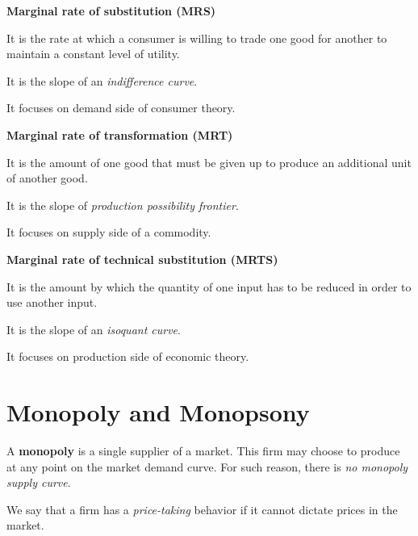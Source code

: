 \documentclass[8pt,a4paper]{extarticle}
\begin{document}
\begin{multicols}{3}
  \sectionbreak

  \begin{boxrmk}
    \textbf{Marginal rate of substitution (MRS)}
    \begin{bulletlist}
      \item It is the rate at which a consumer is willing to trade one good for another to maintain a constant level of utility.
      \item It is the slope of an \emph{indifference curve}.
      \item It focuses on demand side of consumer theory.
    \end{bulletlist}
    \textbf{Marginal rate of transformation (MRT)}
    \begin{bulletlist}
      \item It is the amount of one good that must be given up to produce an additional unit of another good.
      \item It is the slope of \emph{production possibility frontier}.
      \item It focuses on supply side of a commodity.
    \end{bulletlist}
    \textbf{Marginal rate of technical substitution (MRTS)}
    \begin{bulletlist}
      \item It is the amount by which the quantity of one input has to be reduced in order to use another input.
      \item It is the slope of an \emph{isoquant curve}.
      \item It focuses on production side of economic theory.
    \end{bulletlist}
  \end{boxrmk}

  \newpage

  \section{Monopoly and Monopsony}

  \begin{boxdef}[Monopoly]
    A \textbf{monopoly} is a single supplier of a market. This firm may choose to produce at any point on the market demand curve. For such reason, there is \emph{no monopoly supply curve}.
  \end{boxdef}

  \begin{boxrmk}
    We say that a firm has a \emph{price-taking} behavior if it cannot dictate prices in the market.
  \end{boxrmk}


\end{multicols}
\end{document}
